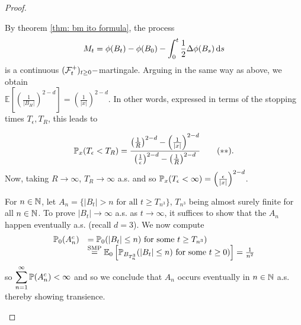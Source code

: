 \documentclass{article}
\begin{document}
\begin{proof}
\begin{enumerate}
{
    }	     		
By theorem \ref{thm: bm ito formula}, the process 
		    \[
		    M_{t} = \phi(B_{t})-\phi(B_{0})- \displaystyle\int^{t}_{0} \frac{1}{2}\Delta \phi(B_{s}) \diff s  
		    \]
		    is a continuous  $(\F^{+}_{t})_{t\geq 0}-$martingale. Arguing in the same way as above, we obtain\\ $\mathbb{E}\left[ \left(\frac{1}{|B_{H}|}\right)^{2-d} \right]= \left(\frac{1}{|x|}\right)^{2-d} $. In other words, expressed in terms of the stopping times $ T_{\epsilon}, T_{R}$, this leads to

    \[
		    \PP_{x}(T_{\epsilon}<T_{R}) = \frac{\left(\frac{1}{R}\right)^{2-d}  - \left(\frac{1}{|x|}\right)^{2-d} }{\left(\frac{1}{\epsilon}\right)^{2-d}  - \left(\frac{1}{R}\right)^{2-d} } \tag{$\ast\ast$}.
		    \]
		    Now, taking $ R\to \infty$, $ T_{R}\to \infty$ a.s. and so $ \PP_{x}(T_{\epsilon}<\infty)= \left(\frac{\epsilon}{|x|}\right)^{2-d} $.\\ 
\parbox[b]{0.55\textwidth}{ %
	    For $ n\in \N$, let $ A_{n} = \{|B_{t}|>n \text{ for all }t\geq T_{n^{3}}\}$, $T_{n^{3}}$ being almost surely finite for all $ n\in \N$. To prove $ |B_{t}|\to \infty$ a.s. as $ t\to \infty$, it suffices to show that the $ A_{n}$ happen eventually a.s. (recall $ d=3$). We now compute
		    \[
		    \begin{array}{ll}
		        \PP_{0}(A_{n}^{c}) &= \PP_{0}(|B_{t}|\leq n) \text{ for some }t\geq T_{n^{3}}) \\
					   &\stackrel{\text{SMP}}{=} \mathbb{E}_{0}\left[ \PP_{B_{T_{n}^{3}}}(|B_{t}|\leq n) \text{ for some }t\geq 0)  \right] = \frac{1}{n^{2}}
		    \end{array}
		    \]
		    so $\displaystyle\sum^{\infty}_{n=1}\PP(A_{n}^{c})<\infty $ and so we conclude that $ A_{n}$ occurs eventually in $ n\in \N$ a.s. thereby showing transience. }
    \hfill  %
    \parbox[b]{0.4\textwidth}{ %
        \centering
        \begin{tikzpicture}[scale=0.4]  %


\end{tikzpicture}}
\end{enumerate}
\end{proof}
\end{document}
